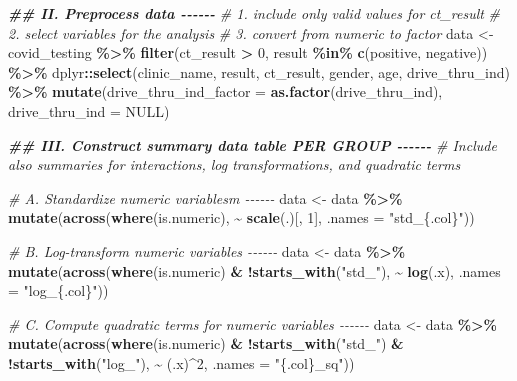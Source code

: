 \documentclass[
]{article}
\newenvironment{Shaded}{\begin{snugshade}}{\end{snugshade}}
\newcommand{\AttributeTok}[1]{\textcolor[rgb]{0.13,0.29,0.53}{#1}}
\newcommand{\CommentTok}[1]{\textcolor[rgb]{0.56,0.35,0.01}{\textit{#1}}}
\newcommand{\ConstantTok}[1]{\textcolor[rgb]{0.56,0.35,0.01}{#1}}
\newcommand{\DecValTok}[1]{\textcolor[rgb]{0.00,0.00,0.81}{#1}}
\newcommand{\DocumentationTok}[1]{\textcolor[rgb]{0.56,0.35,0.01}{\textbf{\textit{#1}}}}
\newcommand{\FunctionTok}[1]{\textcolor[rgb]{0.13,0.29,0.53}{\textbf{#1}}}
\newcommand{\NormalTok}[1]{#1}
\newcommand{\OtherTok}[1]{\textcolor[rgb]{0.56,0.35,0.01}{#1}}
\newcommand{\SpecialCharTok}[1]{\textcolor[rgb]{0.81,0.36,0.00}{\textbf{#1}}}
\newcommand{\StringTok}[1]{\textcolor[rgb]{0.31,0.60,0.02}{#1}}
\begin{document}
\begin{Shaded}
\begin{Highlighting}[]
\DocumentationTok{\#\# II. Preprocess data {-}{-}{-}{-}{-}{-}}
\CommentTok{\# 1. include only valid values for ct\_result}
\CommentTok{\# 2. select variables for the analysis}
\CommentTok{\# 3. convert from numeric to factor}
\NormalTok{data }\OtherTok{\textless{}{-}}\NormalTok{ covid\_testing }\SpecialCharTok{\%\textgreater{}\%}
  \FunctionTok{filter}\NormalTok{(ct\_result }\SpecialCharTok{\textgreater{}} \DecValTok{0}\NormalTok{, result }\SpecialCharTok{\%in\%} \FunctionTok{c}\NormalTok{(}\StringTok{\textquotesingle{}positive\textquotesingle{}}\NormalTok{, }\StringTok{\textquotesingle{}negative\textquotesingle{}}\NormalTok{)) }\SpecialCharTok{\%\textgreater{}\%}
\NormalTok{  dplyr}\SpecialCharTok{::}\FunctionTok{select}\NormalTok{(clinic\_name, result, ct\_result, gender, age, drive\_thru\_ind) }\SpecialCharTok{\%\textgreater{}\%}
  \FunctionTok{mutate}\NormalTok{(}\AttributeTok{drive\_thru\_ind\_factor =} \FunctionTok{as.factor}\NormalTok{(drive\_thru\_ind), }\AttributeTok{drive\_thru\_ind =} \ConstantTok{NULL}\NormalTok{)}

\DocumentationTok{\#\# III. Construct summary data table PER GROUP {-}{-}{-}{-}{-}{-}}
\CommentTok{\# Include also summaries for interactions, log transformations, and quadratic terms}

\CommentTok{\# A. Standardize numeric variablesm {-}{-}{-}{-}{-}{-}}
\NormalTok{data }\OtherTok{\textless{}{-}}\NormalTok{ data }\SpecialCharTok{\%\textgreater{}\%}
  \FunctionTok{mutate}\NormalTok{(}\FunctionTok{across}\NormalTok{(}\FunctionTok{where}\NormalTok{(is.numeric), }\SpecialCharTok{\textasciitilde{}} \FunctionTok{scale}\NormalTok{(.)[, }\DecValTok{1}\NormalTok{], }\AttributeTok{.names =} \StringTok{"std\_\{.col\}"}\NormalTok{))}

\CommentTok{\# B. Log{-}transform numeric variables {-}{-}{-}{-}{-}{-}}
\NormalTok{data }\OtherTok{\textless{}{-}}\NormalTok{ data }\SpecialCharTok{\%\textgreater{}\%}
  \FunctionTok{mutate}\NormalTok{(}\FunctionTok{across}\NormalTok{(}\FunctionTok{where}\NormalTok{(is.numeric) }\SpecialCharTok{\&}
                  \SpecialCharTok{!}\FunctionTok{starts\_with}\NormalTok{(}\StringTok{"std\_"}\NormalTok{),}
                \SpecialCharTok{\textasciitilde{}} \FunctionTok{log}\NormalTok{(.x), }
                \AttributeTok{.names =} \StringTok{"log\_\{.col\}"}\NormalTok{))}

\CommentTok{\# C. Compute quadratic terms for numeric variables {-}{-}{-}{-}{-}{-}}
\NormalTok{data }\OtherTok{\textless{}{-}}\NormalTok{ data }\SpecialCharTok{\%\textgreater{}\%}
  \FunctionTok{mutate}\NormalTok{(}\FunctionTok{across}\NormalTok{(}\FunctionTok{where}\NormalTok{(is.numeric) }\SpecialCharTok{\&}
                  \SpecialCharTok{!}\FunctionTok{starts\_with}\NormalTok{(}\StringTok{"std\_"}\NormalTok{) }\SpecialCharTok{\&}
                  \SpecialCharTok{!}\FunctionTok{starts\_with}\NormalTok{(}\StringTok{"log\_"}\NormalTok{),}
                \SpecialCharTok{\textasciitilde{}}\NormalTok{ (.x)}\SpecialCharTok{\^{}}\DecValTok{2}\NormalTok{, }
                \AttributeTok{.names =} \StringTok{"\{.col\}\_sq"}\NormalTok{))}


\end{Highlighting}
\end{Shaded}
\end{document}
